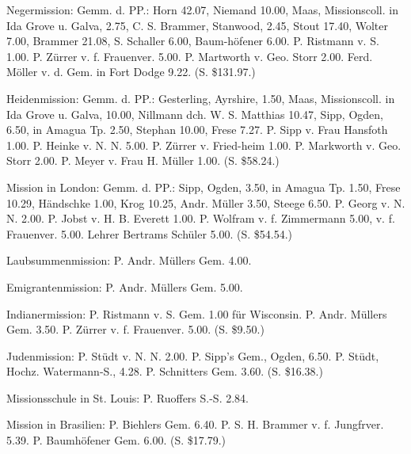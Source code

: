 Negermission: Gemm. d. PP.: Horn 42.07, Niemand 10.00, Maas, Missionscoll. in Ida Grove u. Galva, 2.75, C. S. Brammer, Stanwood, 2.45, Stout 17.40, Wolter 7.00, Brammer 21.08, S. Schaller 6.00, Baum-höfener 6.00. P. Ristmann v. S. 1.00. P. Zürrer v. f. Frauenver. 5.00. P. Martworth v. Geo. Storr 2.00. Ferd. Möller v. d. Gem. in Fort Dodge 9.22. (S. \$131.97.)

Heidenmission: Gemm. d. PP.: Gesterling, Ayrshire, 1.50, Maas, Missionscoll. in Ida Grove u. Galva, 10.00, Nillmann dch. W. S. Matthias 10.47, Sipp, Ogden, 6.50, in Amagua Tp. 2.50, Stephan 10.00, Frese 7.27. P. Sipp v. Frau Hansfoth 1.00. P. Heinke v. N. N. 5.00. P. Zürrer v. Fried-heim 1.00. P. Markworth v. Geo. Storr 2.00. P. Meyer v. Frau H. Müller 1.00. (S. \$58.24.)

Mission in London: Gemm. d. PP.: Sipp, Ogden, 3.50, in Amagua Tp. 1.50, Frese 10.29, Händschke 1.00, Krog 10.25, Andr. Müller 3.50, Steege 6.50. P. Georg v. N. N. 2.00. P. Jobst v. H. B. Everett 1.00. P. Wolfram v. f. Zimmermann 5.00, v. f. Frauenver. 5.00. Lehrer Bertrams Schüler 5.00. (S. \$54.54.)

Laubsummenmission: P. Andr. Müllers Gem. 4.00.

Emigrantenmission: P. Andr. Müllers Gem. 5.00.

Indianermission: P. Ristmann v. S. Gem. 1.00 für Wisconsin. P. Andr. Müllers Gem. 3.50. P. Zürrer v. f. Frauenver. 5.00. (S. \$9.50.)

Judenmission: P. Stüdt v. N. N. 2.00. P. Sipp's Gem., Ogden, 6.50. P. Stüdt, Hochz. Watermann-S., 4.28. P. Schnitters Gem. 3.60. (S. \$16.38.)

Missionsschule in St. Louis: P. Ruoffers S.-S. 2.84.

Mission in Brasilien: P. Biehlers Gem. 6.40. P. S. H. Brammer v. f. Jungfrver. 5.39. P. Baumhöfener Gem. 6.00. (S. \$17.79.)


